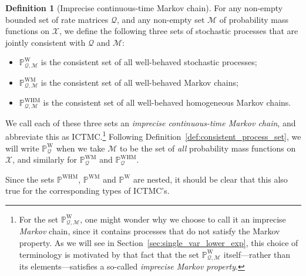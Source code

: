 \documentclass[10pt,a4paper]{paper}
\theoremstyle{definition}
\newtheorem{definition}{Definition}
\newcommand{\states}{\mathcal{X}}
\newcommand{\processes}{\mathbb{P}}
\newcommand{\wprocesses}{\processes^{\mathrm{W}}}
\newcommand{\wmprocesses}{\processes^{\mathrm{WM}}}
\newcommand{\whmprocesses}{\processes^{\mathrm{WHM}}}
\newcommand{\rateset}{\mathcal{Q}}
\newcommand{\ictmc}{{ICTMC}}
\begin{document}
\begin{definition}[Imprecise continuous-time Markov chain]\label{def:process_sets}
For any non-empty bounded set of rate matrices $\rateset$, and any non-empty set $\mathcal{M}$ of probability mass functions on $\states$, we define the following three sets of stochastic processes that are jointly consistent with $\rateset$ and $\mathcal{M}$:
\begin{itemize}
\item $\wprocesses_{\rateset,\mathcal{M}}$ is the consistent set of all well-behaved stochastic processes;
\item $\wmprocesses_{\rateset,\mathcal{M}}$ is the consistent set of all well-behaved Markov chains;
\item $\whmprocesses_{\rateset,\mathcal{M}}$ is the consistent set of all well-behaved homogeneous Markov chains.
\end{itemize}
We call each of these three sets 
 an \emph{imprecise continuous-time Markov chain}, and abbreviate this as \ictmc.\footnote{For the set $\wprocesses_{\rateset,\mathcal{M}}$, one might wonder why we choose to call it an imprecise \emph{Markov} chain, since it contains processes that do not satisfy the Markov property. As we will see in Section~\ref{sec:single_var_lower_exp}, this choice of terminology is motivated by that fact that the set $\wprocesses_{\rateset,\mathcal{M}}$ itself---rather than its elements---satisfies a so-called \emph{imprecise Markov property}.} 
Following Definition~\ref{def:consistent_process_set}, we will write $\wprocesses_{\rateset}$ when we take $\mathcal{M}$ to be the set of \emph{all} probability mass functions on $\states$, and similarly for $\wmprocesses_{\rateset}$ and $\whmprocesses_{\rateset}$.
\end{definition}

 Since the sets $\whmprocesses$, $\wmprocesses$ and $\wprocesses$
 are nested, it should be clear that this also true for the corresponding types of \ictmc's.
\end{document}
